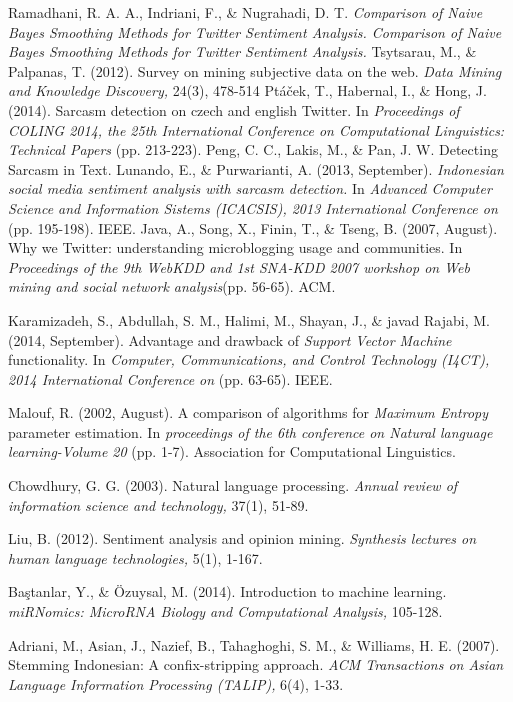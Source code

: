 
\begin{thebibliography}{7}

{Ramadhani, R. A. A., Indriani, F., \& Nugrahadi, D. T. \emph{Comparison of Naive Bayes Smoothing Methods for Twitter Sentiment Analysis. Comparison of Naive Bayes Smoothing Methods for Twitter Sentiment Analysis.}}
{Tsytsarau, M., \& Palpanas, T. (2012). Survey on mining subjective data on the web. \emph{Data Mining and Knowledge Discovery,} 24(3), 478-514}
{Ptáček, T., Habernal, I., \& Hong, J. (2014). Sarcasm detection on czech and english Twitter. In \emph{Proceedings of COLING 2014, the 25th International Conference on Computational Linguistics: Technical Papers} (pp. 213-223).}
{Peng, C. C., Lakis, M., \& Pan, J. W. Detecting Sarcasm in Text.}
{Lunando, E., \& Purwarianti, A. (2013, September). \emph{Indonesian social media sentiment analysis with sarcasm detection.} In \emph{Advanced Computer Science and Information Sistems (ICACSIS), 2013 International Conference on} (pp. 195-198). IEEE.}
{Java, A., Song, X., Finin, T., \& Tseng, B. (2007, August). Why we Twitter: understanding microblogging usage and communities. In \emph{Proceedings of the 9th WebKDD and 1st SNA-KDD 2007 workshop on Web mining and social network analysis}(pp. 56-65). ACM.}

{Karamizadeh, S., Abdullah, S. M., Halimi, M., Shayan, J., \& javad Rajabi, M. (2014, September). Advantage and drawback of \emph{Support Vector Machine} functionality. In \emph{Computer, Communications, and Control Technology (I4CT), 2014 International Conference on} (pp. 63-65). IEEE.}

{Malouf, R. (2002, August). A comparison of algorithms for \emph{Maximum Entropy} parameter estimation. In \emph{proceedings of the 6th conference on Natural language learning-Volume 20 }(pp. 1-7). Association for Computational Linguistics.}

{Chowdhury, G. G. (2003). Natural language processing. \emph{Annual review of information science and technology,} 37(1), 51-89.}

{Liu, B. (2012). Sentiment analysis and opinion mining. \emph{Synthesis lectures on human language technologies, }5(1), 1-167.}

{Baştanlar, Y., \& Özuysal, M. (2014). Introduction to machine learning. \emph{miRNomics: MicroRNA Biology and Computational Analysis,} 105-128.}

{Adriani, M., Asian, J., Nazief, B., Tahaghoghi, S. M., \& Williams, H. E. (2007). Stemming Indonesian: A confix-stripping approach. \emph{ACM Transactions on Asian Language Information Processing (TALIP), }6(4), 1-33.}


\end{thebibliography}
